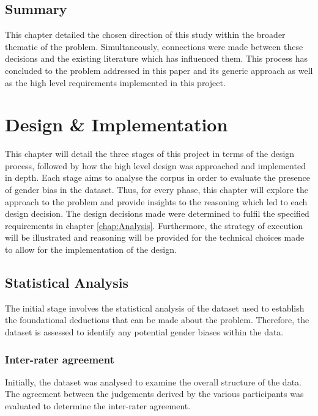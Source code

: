 \documentclass{l4proj}
\begin{document}
\section{Summary}
This chapter detailed the chosen direction of this study within the broader thematic of the problem. Simultaneously, connections were made between these decisions and the existing literature which has influenced them. This process has concluded to the problem addressed in this paper and its generic approach as well as the high level requirements implemented in this project.
\chapter{Design \& Implementation}\label{chap:Design_Implementation}

This chapter will detail the three stages of this project in terms of the design process, followed by how the high level design was approached and implemented in depth.
Each stage aims to analyse the corpus in order to evaluate the presence of gender bias in the dataset. Thus, for every phase, this chapter will explore the approach to the problem and provide insights to the reasoning which led to each design decision. The design decisions made were determined to fulfil the specified requirements in chapter \ref{chap:Analysis}. Furthermore, the strategy of execution will be illustrated and reasoning will be provided for the technical choices made to allow for the implementation of the design.

\section{Statistical Analysis}\label{sec:Implementation_stat}

The initial stage involves the statistical analysis of the dataset used to establish the foundational deductions that can be made about the problem. Therefore, the dataset is assessed to identify any potential gender biases within the data.

\subsection{Inter-rater agreement}\label{sec:design_agreement}

Initially, the dataset was analysed to examine the overall structure of the data. The agreement between the judgements derived by the various participants was evaluated to determine the inter-rater agreement. 
\end{document}
